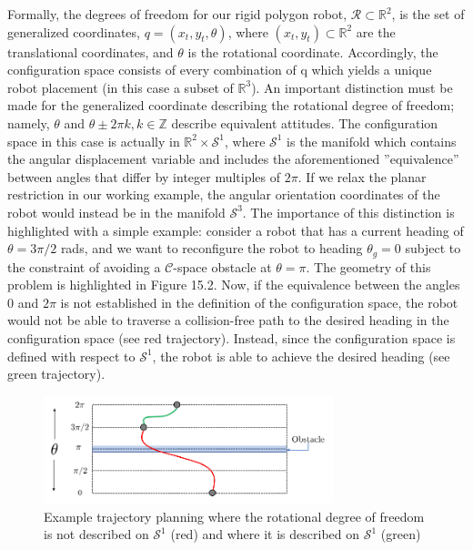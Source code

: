 \documentclass[twoside]{article}
\begin{document}
Formally, the degrees of freedom for our rigid polygon robot, $\mathcal{R} \subset \mathbb{R}^2$, is the set of generalized coordinates, $q = (x_t, y_t, \theta)$, where $(x_t, y_t) \subset \mathbb{R}^2$ are the translational coordinates, and $\theta$ is the rotational coordinate. Accordingly, the configuration space consists of every combination of q which yields a unique robot placement (in this case a subset of $\mathbb{R}^3$). An important distinction must be made for the generalized coordinate describing the rotational degree of freedom; namely, $\theta$ and $\theta \pm 2\pi k, k \in \mathbb{Z}$ describe equivalent attitudes. The configuration space in this case is actually in $\mathbb{R}^2 \times \mathcal{S}^1$, where $\mathcal{S}^1$ is the manifold which contains the angular displacement variable and includes the aforementioned ”equivalence” between angles that differ by integer multiples of $2\pi$. If we relax the planar restriction in our working example, the angular orientation coordinates of the robot would instead be in the manifold $\mathcal{S}^3$. The importance of this distinction is highlighted with a simple example: consider a robot that has a current heading of $\theta = 3\pi/2$ rads, and we want to reconfigure the robot to heading $\theta_g = 0$ subject to the constraint of avoiding a $\mathcal{C}$-space obstacle at $\theta = \pi$. The geometry of this problem is highlighted in Figure 15.2. Now, if the equivalence between the angles 0 and $2\pi$ is not established in the definition of the configuration space, the robot would not be able to traverse a collision-free path to the desired heading in the configuration space (see red trajectory). Instead, since the configuration space is defined with respect to $\mathcal{S}^1$, the robot is able to achieve the desired heading (see green trajectory).

\begin{figure}[ht!]
\begin{center}
\includegraphics[width=0.75\textwidth]{fig15_2.PNG}
\caption{Example trajectory planning where the rotational degree of freedom is not described on $\mathcal{S}^1$ (red) and where it is described on $\mathcal{S}^1$ (green)}
\end{center}
\end{figure}
\end{document}
